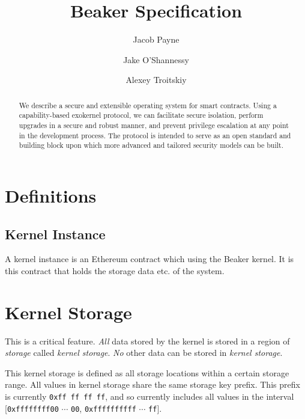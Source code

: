 \documentclass[english,a4paper]{article}
\title{Beaker Specification}\label{beaker-specification}
\author{Jacob Payne \and Jake O'Shannessy \and Alexey Troitskiy}
\begin{document}
\maketitle

\begin{abstract}\label{abstract}

We describe a secure and extensible operating system for smart contracts. Using
a capability-based exokernel protocol, we can facilitate secure isolation,
perform upgrades in a secure and robust manner, and prevent privilege escalation
at any point in the development process. The protocol is intended to serve as an
open standard and building block upon which more advanced and tailored security
models can be built.

\end{abstract}

\newpage
\tableofcontents
\newpage

\section{Definitions}\label{definitions}

\subsection{Kernel Instance}
A kernel instance is an Ethereum contract which using the Beaker kernel. It is
this contract that holds the storage data etc. of the system.

\section{Kernel Storage}\label{kernel-storage}
This is a critical feature. \emph{All} data stored by the kernel is stored in a
region of \emph{storage} called \emph{kernel storage}. \emph{No} other data can
be stored in \emph{kernel storage}.

This kernel storage is defined as all storage locations within a certain storage
range. All values in kernel storage share the same storage key prefix. This
prefix is currently \texttt{0xff ff ff ff}, and so currently includes all values in the interval
[\texttt{0xffffffff00} $\cdots$ \texttt{00}, \texttt{0xffffffffff} $\cdots$ \texttt{ff}].
\end{document}
